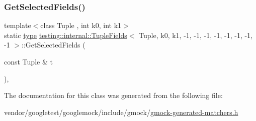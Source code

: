 \subsubsection{\texorpdfstring{Get\+Selected\+Fields()}{GetSelectedFields()}}
{\footnotesize\ttfamily template$<$class Tuple , int k0, int k1$>$ \\
static \hyperlink{classtesting_1_1internal_1_1_tuple_fields_3_01_tuple_00_01k0_00_01k1_00_01-1_00_01-1_00_01-1_00_bfbbbfc9cc03949b0b1ff3620709d8ff_ad0dd4e84d48ec9a5ef262cf32f6979f9}{type} \hyperlink{classtesting_1_1internal_1_1_tuple_fields}{testing\+::internal\+::\+Tuple\+Fields}$<$ Tuple, k0, k1, -\/1, -\/1, -\/1, -\/1, -\/1, -\/1, -\/1, -\/1 $>$\+::Get\+Selected\+Fields (\begin{DoxyParamCaption}\item[{const Tuple \&}]{t }\end{DoxyParamCaption})\hspace{0.3cm}{\ttfamily [inline]}, {\ttfamily [static]}}



The documentation for this class was generated from the following file\+:\begin{DoxyCompactItemize}
\item 
vendor/googletest/googlemock/include/gmock/\hyperlink{gmock-generated-matchers_8h}{gmock-\/generated-\/matchers.\+h}\end{DoxyCompactItemize}
